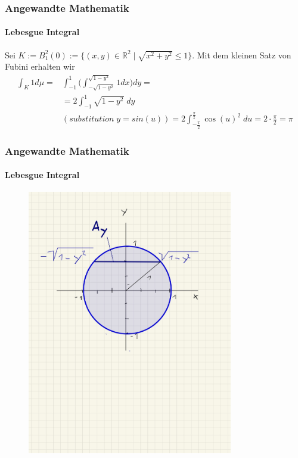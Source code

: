 \documentclass{beamer}
\begin{document}
\begin{frame}
    \frametitle{Angewandte Mathematik}
\framesubtitle{Lebesgue Integral}
\begin{block}{}
Sei $K := B^2_1(0) := \{   (x,y) \in \mathbb{R}^2 \; | \; \sqrt{x^2 + y^2 } \leq 1\}$. Mit dem kleinen Satz von Fubini erhalten wir
\begin{align*}
\int_K 1 d \mu = &  \int_{-1}^{1} \biggl ( \int_{-\sqrt{1- y^2}}^{\sqrt{1- y^2}} 1 dx \biggr ) dy = \\ 
& =  2 \int_{-1}^{1}  \sqrt{1 - y^2}   \; dy  \\ 
 & (substitution \;   y = sin(u)) =   2 \int_{-\frac{\pi}{2}}^{\frac{\pi}{2}}   \cos(u)^2   \; du = 2 \cdot \frac{\pi}{2} = \pi
\end{align*}
\end{block}
 \end{frame}



\begin{frame}
    \frametitle{Angewandte Mathematik}
\framesubtitle{Lebesgue Integral}
\begin{figure}[H]
      \centering
    \includegraphics[width=0.8\textwidth]{images/Kreis}
\end{figure}
 \end{frame}
\end{document}
